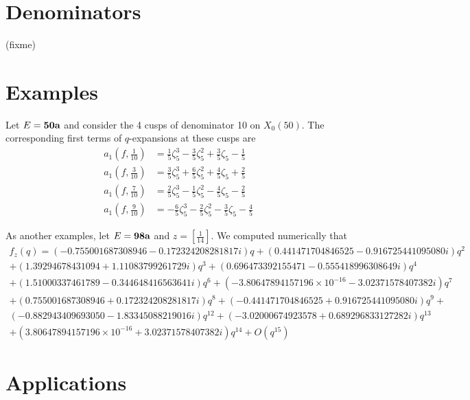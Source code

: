 \documentclass [11pt, proquest] {uwthesis}[2015/03/03]
\begin{document}
\section{Denominators}

(fixme)



\section{Examples}

Let $E = {\bf 50a}$ and consider the 4 cusps of denominator 10 on $X_0(50)$. The corresponding first terms 
of $q$-expansions at these cusps are  
\begin{align*}
	a_1(f, \frac{1}{10}) &= \frac{1}{5} \zeta_{5}^{3} - \frac{3}{5} \zeta_{5}^{2} + \frac{3}{5} \zeta_{5} - \frac{1}{5} \\ 
	a_1(f, \frac{3}{10}) &= \frac{3}{5} \zeta_{5}^{3} + \frac{6}{5} \zeta_{5}^{2} + \frac{4}{5} \zeta_{5} + \frac{2}{5} \\
	a_1(f, \frac{7}{10}) &= \frac{2}{5} \zeta_{5}^{3} - \frac{1}{5} \zeta_{5}^{2} - \frac{4}{5} \zeta_{5} - \frac{2}{5}\\
	a_1(f, \frac{9}{10}) &=-\frac{6}{5} \zeta_{5}^{3} - \frac{2}{5} \zeta_{5}^{2} - \frac{3}{5} \zeta_{5} - \frac{4}{5}
\end{align*}

As another examples, let $E = {\bf 98a}$ and $z = [\frac{1}{14}]$. We computed numerically that
\begin{align*}
f_z(q) = \left(-0.755001687308946 - 0.172324208281817i\right)q + \left(0.441471704846525 - 0.916725441095080i\right)q^{2} \\ 
+ \left(1.39294678431094 + 1.11083799261729i\right)q^{3} + \left(0.696473392155471 - 0.555418996308649i\right)q^{4} \\ 
+ \left(1.51000337461789 - 0.344648416563641i\right)q^{6} + \left(-3.80647894157196 \times 10^{-16} - 3.02371578407382i\right)q^{7} \\
+ \left(0.755001687308946 + 0.172324208281817i\right)q^{8} + \left(-0.441471704846525 + 0.916725441095080i\right)q^{9} +  \\ 
\left(-0.882943409693050 - 1.83345088219016i\right)q^{12} + \left(-3.02000674923578 + 0.689296833127282i\right)q^{13} \\
+ \left(3.80647894157196 \times 10^{-16} + 3.02371578407382i\right)q^{14} + O(q^{15})
\end{align*}


\section{Applications}
\end{document}
